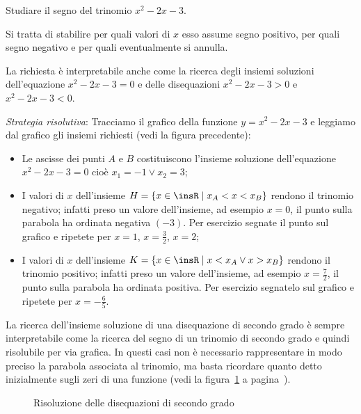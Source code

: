\begin{exrig}
\begin{esempio}
Studiare il segno del trinomio $x^2-2x-3$.

Si tratta di stabilire per quali valori di $x$ esso assume segno positivo, per quali segno negativo e per quali eventualmente si annulla.

La richiesta è interpretabile anche come la ricerca degli insiemi soluzioni dell'equazione $x^2-2x-3=0$ e delle disequazioni $x^2-2x-3>0$ e $x^2-2x-3<0$.

\emph{Strategia risolutiva}:
Tracciamo il grafico della funzione $y=x^2-2x-3$ e leggiamo dal grafico gli insiemi richiesti (vedi la figura precedente):
\begin{itemize}
\item Le ascisse dei punti $A$ e $B$ costituiscono l'insieme soluzione dell'equazione $x^2-2x-3=0$ cioè $x_1=-1\vee x_2=3$;
\item I valori di $x$ dell'insieme $H=\{x\in \insR \mid x_A<x<x_B\}$ rendono il trinomio negativo; infatti preso un valore dell'insieme, ad esempio $x=0$, il punto sulla parabola ha ordinata negativa $(-3)$. Per esercizio segnate il punto sul grafico e ripetete per $x=1$, $x=\frac 3 2$, $x=2$;
\item I valori di $x$ dell'insieme $K=\{x\in \insR \mid x<x_A\vee x>x_B\}$ rendono il trinomio positivo; infatti preso un valore dell'insieme, ad esempio $x=\frac 7 2$, il punto sulla parabola ha ordinata positiva. Per esercizio segnatelo sul grafico e ripetete per $x=-\frac{6}{5}$.
\end{itemize}
\end{esempio}
\end{exrig}
\osservazione La ricerca dell'insieme soluzione di una disequazione di secondo grado è sempre interpretabile come la ricerca del segno di un trinomio di secondo grado e quindi risolubile per via grafica. In questi casi non è necessario rappresentare in modo preciso la parabola associata al trinomio, ma basta ricordare quanto detto inizialmente sugli zeri di una funzione (vedi la figura~\ref{fig:subfig10} a pagina~\pageref{fig:subfig10}).

\begin{figure}[tp]
\centering

\vspace{12pt}
{}
\vspace{12pt}
{}
\vspace{12pt}
{}
\vspace{12pt}
{}
\vspace{12pt}
{}
\caption{Risoluzione delle disequazioni di secondo grado}
\label{fig:subfig10}
\end{figure}

